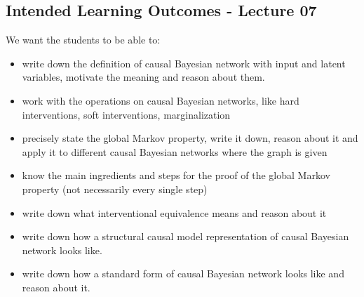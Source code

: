 \subsection*{Intended Learning Outcomes - Lecture 07}

We want the students to be able to:
\begin{itemize}
\item write down the definition of causal Bayesian network with input and latent variables, motivate the meaning and reason about them.
\item work with the operations on causal Bayesian networks, like hard interventions, soft interventions, marginalization
\item precisely state the global Markov property, write it down, reason about it and apply it to different causal Bayesian networks where the graph is given
\item know the main ingredients and steps for the proof of the global Markov property (not necessarily every single step)
\item write down what interventional equivalence means and reason about it
\item write down how a structural causal model representation of causal Bayesian network looks like.
\item write down how a standard form of causal Bayesian network looks like and reason about it.
\end{itemize}
